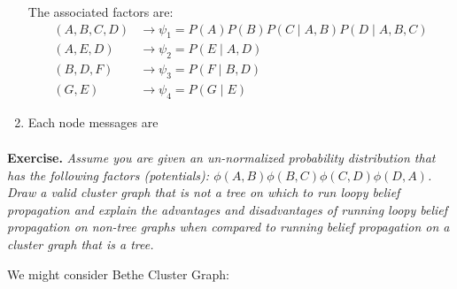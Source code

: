 \documentclass[11pt]{article}
\theoremstyle{definition}
\begin{document}
\begin{enumerate}
\begin{figure}[H]
    \end{figure}
    The associated factors are:
    \[
        \begin{aligned}
            (A, B, C, D) &\to \psi_1 = P(A)P(B)P(C\mid A, B)P(D \mid A, B, C)\\
            (A, E, D) &\to \psi_2 = P(E \mid A, D)\\
            (B, D, F) &\to \psi_3 = P(F \mid B, D)\\
            (G, E) &\to \psi_4 = P(G \mid E)
        \end{aligned}
    \]
    \item Each node messages are 
    \[
        \begin{aligned}
        \end{aligned}
    \]
\end{enumerate}



\textbf{Exercise.} \emph{Assume you are given an un-normalized probability distribution that has the following factors (potentials): \( \phi(A,B)\phi(B,C)\phi(C,D)\phi(D,A) \). Draw a valid cluster graph that is not a tree on which to run loopy belief propagation and explain the advantages and disadvantages of running loopy belief propagation on non-tree graphs when compared to running belief propagation on a cluster graph that is a tree.}

We might consider Bethe Cluster Graph:
\begin{figure}[H]
    \centering
{}
\end{figure}
\end{document}
